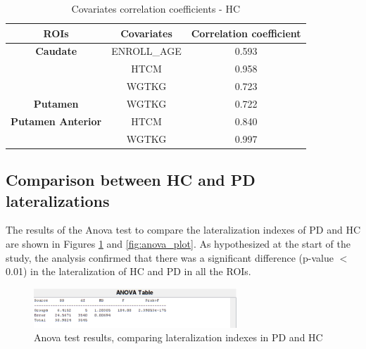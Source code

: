\documentclass[]{article}
\begin{document}
\begin{table}[h]
	\centering
	\begin{tabular}{|c|c|c|}
		\hline
		\textbf{ROIs}             & \textbf{Covariates} & \textbf{Correlation coefficient} \\ \hline
		\textbf{Caudate}          & ENROLL\_AGE         & 0.593                            \\ \hline
		\textbf{}                 & HTCM                & 0.958                            \\ \hline
		\textbf{}                 & WGTKG               & 0.723                            \\ \hline
		\textbf{Putamen}          & WGTKG               & 0.722                            \\ \hline
		\textbf{Putamen Anterior} & HTCM                & 0.840                            \\ \hline
		\textbf{}                 & WGTKG               & 0.997                            \\ \hline
	\end{tabular}
	\caption{Covariates correlation coefficients - HC}
	\label{tbl:cov_hc}
\end{table}

\begin{multicols}{2}

\subsection{Comparison between HC and PD lateralizations}

The results of the Anova test to compare the lateralization indexes of PD and HC are shown in Figures \ref{fig:anova_table} and \ref{fig:anova_plot}.
As hypothesized at the start of the study, the analysis confirmed that there was a significant difference (p-value $<$ 0.01) in the lateralization of HC and PD in all the ROIs.

\end{multicols}

\begin{figure}[h]
\centering
\includegraphics[width=3in]{../anova_table_lat_hc_pd}
\caption{Anova test results, comparing lateralization indexes in PD and HC}
\label{fig:anova_table}
\end{figure} 
\end{document}
